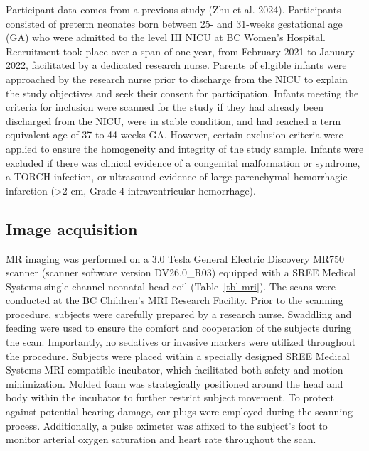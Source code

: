 \documentclass[
sn-nature
]{sn-jnl}
\begin{document}
Participant data comes from a previous study (Zhu et al. 2024).
Participants consisted of preterm neonates born between 25- and 31-weeks
gestational age (GA) who were admitted to the level III NICU at BC
Women's Hospital. Recruitment took place over a span of one year, from
February 2021 to January 2022, facilitated by a dedicated research
nurse. Parents of eligible infants were approached by the research nurse
prior to discharge from the NICU to explain the study objectives and
seek their consent for participation. Infants meeting the criteria for
inclusion were scanned for the study if they had already been discharged
from the NICU, were in stable condition, and had reached a term
equivalent age of 37 to 44 weeks GA. However, certain exclusion criteria
were applied to ensure the homogeneity and integrity of the study
sample. Infants were excluded if there was clinical evidence of a
congenital malformation or syndrome, a TORCH infection, or ultrasound
evidence of large parenchymal hemorrhagic infarction (\textgreater2 cm,
Grade 4 intraventricular hemorrhage).

\subsection{Image acquisition}\label{image-acquisition}

MR imaging was performed on a 3.0 Tesla General Electric Discovery MR750
scanner (scanner software version DV26.0\_R03) equipped with a SREE
Medical Systems single-channel neonatal head coil (Table~\ref{tbl-mri}).
The scans were conducted at the BC Children's MRI Research Facility.
Prior to the scanning procedure, subjects were carefully prepared by a
research nurse. Swaddling and feeding were used to ensure the comfort
and cooperation of the subjects during the scan. Importantly, no
sedatives or invasive markers were utilized throughout the procedure.
Subjects were placed within a specially designed SREE Medical Systems
MRI compatible incubator, which facilitated both safety and motion
minimization. Molded foam was strategically positioned around the head
and body within the incubator to further restrict subject movement. To
protect against potential hearing damage, ear plugs were employed during
the scanning process. Additionally, a pulse oximeter was affixed to the
subject's foot to monitor arterial oxygen saturation and heart rate
throughout the scan.

\begingroup\fontsize{8}{10}\selectfont
\end{document}
